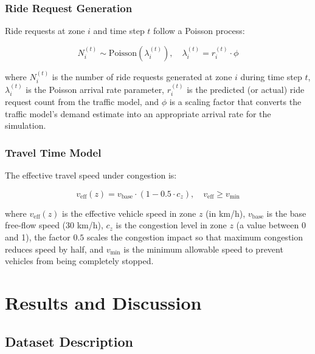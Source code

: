 \documentclass[journal]{IEEEtran}
\begin{document}
\subsubsection{Ride Request Generation}
Ride requests at zone $i$ and time step $t$ follow a Poisson process:

\begin{equation}
N_i^{(t)} \sim \text{Poisson}\left(\lambda_i^{(t)}\right), \quad \lambda_i^{(t)} = r_i^{(t)} \cdot \phi
\label{eq:poisson}
\end{equation}

\noindent where $N_i^{(t)}$ is the number of ride requests generated at zone $i$ during time step $t$, $\lambda_i^{(t)}$ is the Poisson arrival rate parameter, $r_i^{(t)}$ is the predicted (or actual) ride request count from the traffic model, and $\phi$ is a scaling factor that converts the traffic model's demand estimate into an appropriate arrival rate for the simulation.

\subsubsection{Travel Time Model}
The effective travel speed under congestion is:

\begin{equation}
v_{\text{eff}}(z) = v_{\text{base}} \cdot (1 - 0.5 \cdot c_z), \quad v_{\text{eff}} \geq v_{\min}
\label{eq:speed}
\end{equation}

\noindent where $v_{\text{eff}}(z)$ is the effective vehicle speed in zone $z$ (in km/h), $v_{\text{base}}$ is the base free-flow speed (30 km/h), $c_z$ is the congestion level in zone $z$ (a value between 0 and 1), the factor $0.5$ scales the congestion impact so that maximum congestion reduces speed by half, and $v_{\min}$ is the minimum allowable speed to prevent vehicles from being completely stopped.



\section{Results and Discussion}

\subsection{Dataset Description}
\end{document}
